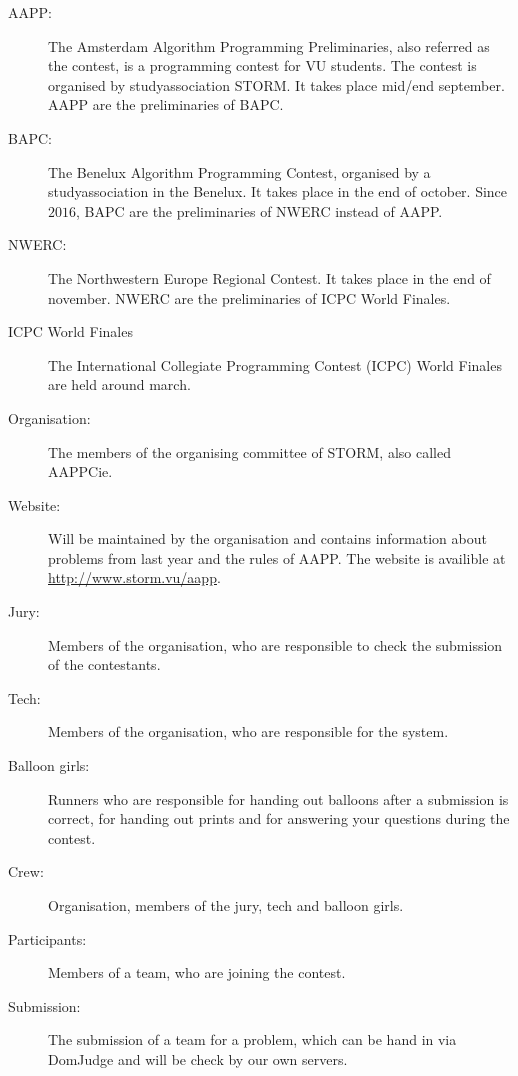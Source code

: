 \begin{description}
\item[AAPP:]
The Amsterdam Algorithm Programming Preliminaries, also referred as the contest, is a programming contest for VU students. The contest is organised by studyassociation STORM. It takes place mid/end september. AAPP are the preliminaries of BAPC.

\item[BAPC:]
The Benelux Algorithm Programming Contest, organised by a studyassociation in the Benelux. It takes place in the end of october. Since $2016$, BAPC are the preliminaries of NWERC instead of AAPP.

\item[NWERC:]
The Northwestern Europe Regional Contest. It takes place in the end of november. NWERC are the preliminaries of ICPC World Finales.

\item[ICPC World Finales]
The International Collegiate Programming Contest (ICPC) World Finales are held around march.

\item[Organisation:]
The members of the organising committee of STORM, also called AAPPCie.

\item[Website:]
Will be maintained by the organisation and contains information about problems from last year and the rules of AAPP. The website is availible at \url{http://www.storm.vu/aapp}.

\item[Jury:]
Members of the organisation, who are responsible to check the submission of the contestants.

\item[Tech:]
Members of the organisation, who are responsible for the system.

\item[Balloon girls:]
Runners who are responsible for handing out balloons after a submission is correct, for handing out prints and for answering your questions during the contest.

\item[Crew:]
Organisation, members of the jury, tech and balloon girls.

\item[Participants:]
Members of a team, who are joining the contest.

\item[Submission:]
The submission of a team for a problem, which can be hand in via DomJudge and will be check by our own servers.
\end{description}